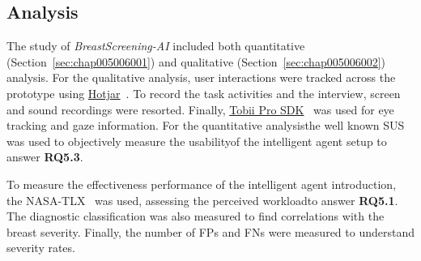

\subsection{Analysis}
\label{sec:chap005005003}

The study of {\it BreastScreening-AI} included both quantitative (Section~\ref{sec:chap005006001}) and qualitative (Section~\ref{sec:chap005006002}) analysis.
For the qualitative analysis\footnotemark[23], user interactions were tracked across the prototype using \href{https://www.hotjar.com/}{Hotjar}~\cite{liikkanen2017data}.
To record the task activities and the interview, screen and sound recordings were resorted.
Finally, \href{https://www.tobiipro.com/product-listing/tobii-pro-sdk/}{Tobii Pro SDK}~\cite{chatelain2018evaluation} was used for eye tracking and gaze information.
For the quantitative analysis\footnotemark[24] the well known \ac{SUS}~\cite{Tyllinen:2016:WNN:2858036.2858570} was used to objectively measure the usability\footnotemark[25] of the intelligent agent setup to answer {\bf RQ5.3}.

To measure the effectiveness performance of the intelligent agent introduction, the \ac{NASA-TLX}~\cite{ramkumar2017using, grier2015high} was used, assessing the perceived workload\footnotemark[26] to answer {\bf RQ5.1}.
The diagnostic classification was also measured to find correlations with the breast severity.
Finally, the number of \acp{FP} and \acp{FN} were measured to understand severity rates.


